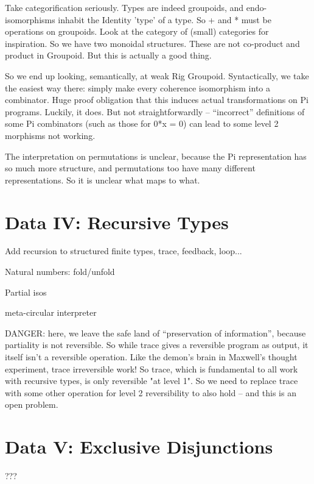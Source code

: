 \documentclass{article}
\begin{document}
Take categorification seriously. Types are indeed groupoids, and
endo-isomorphisms inhabit the Identity 'type' of a type. So + and *
must be operations on groupoids. Look at the category of (small)
categories for inspiration. So we have two monoidal structures.
These are not co-product and product in Groupoid. But this is actually
a good thing.

So we end up looking, semantically, at weak Rig Groupoid. Syntactically,
we take the easiest way there: simply make every coherence isomorphism into
a combinator. Huge proof obligation that this induces actual transformations
on Pi programs. Luckily, it does.  But not straightforwardly -- ``incorrect''
definitions of some Pi combinators (such as those for 0*x = 0) can lead to
some level 2 morphisms not working. 

The interpretation on permutations is unclear, because the Pi representation
has so much more structure, and permutations too have many different 
representations. So it is unclear what maps to what.

\section{Data IV: Recursive Types}

Add recursion to structured finite types, trace, feedback, loop...

Natural numbers: fold/unfold

Partial isos

meta-circular interpreter
 
DANGER: here, we leave the safe land of ``preservation of information'',
because partiality is not reversible. So while trace gives a reversible
program as output, it itself isn't a reversible operation. Like the
demon's brain in Maxwell's thought experiment, trace irreversible work!
So trace, which is fundamental to all work with recursive types, is
only reversible "at level 1". So we need to replace trace with some other
operation for level 2 reversibility to also hold -- and this is an open
problem.

\section{Data V: Exclusive Disjunctions}

???
\end{document}

